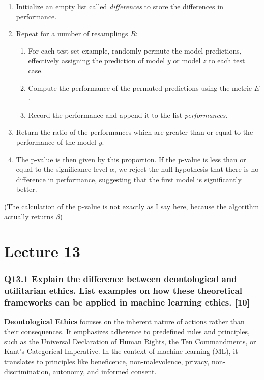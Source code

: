 \documentclass[11pt]{article}
\begin{document}
\begin{enumerate}
    \item Initialize an empty list called \textit{differences} to store the differences in performance.
    \item Repeat for a number of resamplings \( R \):
    \begin{enumerate}
        \item For each test set example, randomly permute the model predictions, effectively assigning the prediction of model \( y \) or model \( z \) to each test case.
        \item Compute the performance of the permuted predictions using the metric \( E \).
        \item Record the performance and append it to the list \textit{performances}.
    \end{enumerate}
    \item Return the ratio of the performances which are greater than or equal to the performance of the model $y$.
    \item The p-value is then given by this proportion. If the p-value is less than or equal to the significance level \( \alpha \), we reject the null hypothesis that there is no difference in performance, suggesting that the first model is significantly better.
\end{enumerate}

(The calculation of the p-value is not exactly as I say here, because the algorithm actually returns $\beta$)

\part{Lecture 13}


\section{Q13.1 Explain the difference between deontological and utilitarian ethics. List examples on how these theoretical frameworks can be applied in machine learning ethics. [10]}

\textbf{Deontological Ethics} focuses on the inherent nature of actions rather than their consequences. It emphasizes adherence to predefined rules and principles, such as the Universal Declaration of Human Rights, the Ten Commandments, or Kant's Categorical Imperative. In the context of machine learning (ML), it translates to principles like beneficence, non-malevolence, privacy, non-discrimination, autonomy, and informed consent.
\end{document}
